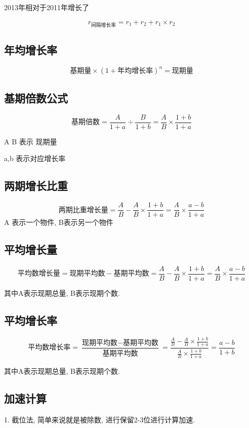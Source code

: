 \documentclass[UTF8]{ctexart}
\begin{document}
2013年相对于2011年增长了

$$
	r_{间隔增长率} = r_1 + r_2 + r_1 \times r_2
$$

\subsection{年均增长率}

$$
	\mbox{基期量} \times (1+\mbox{年均增长率})^n = \mbox{现期量}
$$


\subsection{基期倍数公式}

$$
	基期倍数 = \frac{A}{1+a} \div \frac{B}{1+b} = \frac{A}{B} \times \frac{1+b}{1+a}
$$

A B 表示 现期量

a,b 表示对应增长率

\subsection{两期增长比重}

$$
	\mbox{两期比重增长量} = \frac{A}{B} - \frac{A}{B} \times \frac{1+b}{1+a} =
	\frac{A}{B} \times \frac{a-b}{1+a}
$$
A 表示一个物件, B表示另一个物件


\subsection{平均增长量}

$$
	\mbox{平均数增长量} = \mbox{现期平均数} - \mbox{基期平均数} = \frac{A}{B} - \frac{A}{B} \times \frac{1+b}{1+a} =
	\frac{A}{B} \times \frac{a-b}{1+a}
$$

其中A表示现期总量, B表示现期个数.

\subsection{平均增长率}

$$
	\mbox{平均数增长率} = \frac{\mbox{现期平均数} - \mbox{基期平均数}}{\mbox{基期平均数}} =
	\frac{\frac{A}{B}-\frac{A}{B} \times \frac{1+b}{1+a}}{\frac{A}{B} \times \frac{1+b}{1+a}} = \frac{a-b}{1+b}
$$

其中A表示现期总量, B表示现期个数.

\subsection{加速计算}
1. 截位法, 简单来说就是被除数, 进行保留2-3位进行计算加速.
\end{document}
